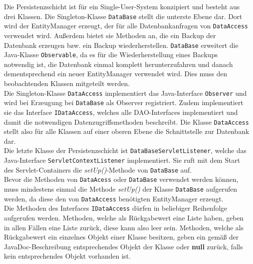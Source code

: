 \documentclass[fontsize=12pt,paper=a4,twoside]{scrartcl}
\begin{document}
Die Persistenzschicht ist für ein Single-User-System konzipiert und besteht aus drei Klassen. Die Singleton-Klasse \texttt{DataBase} stellt die unterste Ebene dar. Dort wird der EntityManager erzeugt, der für alle Datenbankanfragen von \texttt{DataAccess} verwendet wird. Außerdem bietet sie Methoden an, die ein Backup der Datenbank erzeugen bzw. ein Backup wiederherstellen. \texttt{DataBase} erweitert die Java-Klasse \texttt{Observable}, da es für die Wiederherstellung eines Backups notwendig ist, die Datenbank einmal komplett herunterzufahren und danach dementsprechend ein neuer EntityManager verwendet wird. Dies muss den beobachtenden Klassen mitgeteilt werden.\\
Die Singleton-Klasse \texttt{DataAccess} implementiert das Java-Interface \texttt{Observer} und wird bei Erzeugung bei \texttt{DataBase} als Observer registriert. Zudem implementiert sie das Interface \texttt{IDataAccess}, welches alle DAO-Interfaces implementiert und damit die notwendigen Datenzugriffsmethoden beschreibt. Die Klasse \texttt{DataAccess} stellt also für alle Klassen auf einer oberen Ebene die Schnittstelle zur Datenbank dar.\\
Die letzte Klasse der Persistenzschicht ist \texttt{DataBaseServletListener}, welche das Java-Interface \texttt{ServletContextListener} implementiert. Sie ruft mit dem Start des Servlet-Containers die \textit{setUp()}-Methode von \texttt{DataBase} auf.\\

Bevor die Methoden von \texttt{DataAcess} oder \texttt{DataBase} verwendet werden können, muss mindestens einmal die Methode \textit{setUp()} der Klasse \texttt{DataBase} aufgerufen werden, da diese den von \texttt{DataAccess} benötigten EntityManager erzeugt.\\
Die Methoden des Interfaces \texttt{IDataAccess} dürfen in beliebiger Reihenfolge aufgerufen werden. Methoden, welche als Rückgabewert eine Liste haben, geben in allen Fällen eine Liste zurück, diese kann also leer sein. Methoden, welche als Rückgabewert ein einzelnes Objekt einer Klasse besitzen, geben ein gemäß der JavaDoc-Beschreibung entsprechendes Objekt der Klasse oder \textbf{null} zurück, falls kein entsprechendes Objekt vorhanden ist. 



\end{document}
